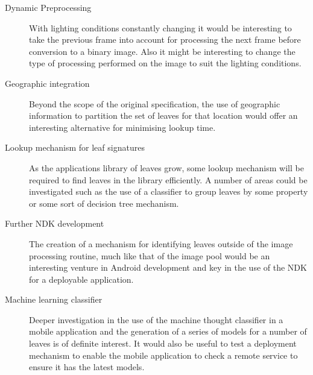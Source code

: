 \begin{description}
\item[Dynamic Preprocessing] With lighting conditions constantly changing it would be interesting to take the previous frame into account for processing the next frame before conversion to a binary image. Also it might be interesting to change the type of processing performed on the image to suit the lighting conditions.
\item[Geographic integration] Beyond the scope of the original specification, the use of geographic information to partition the set of leaves for that location would offer an interesting alternative for minimising lookup time.
\item[Lookup mechanism for leaf signatures] As the applications library of leaves grow, some lookup mechanism will be required to find leaves in the library efficiently. A number of areas could be investigated such as the use of a classifier to group leaves by some property or some sort of decision tree mechanism.
\item[Further NDK development] The creation of a mechanism for identifying leaves outside of the image processing routine, much like that of the image pool would be an interesting venture in Android development and key in the use of the NDK for a deployable application.
\item[Machine learning classifier] Deeper investigation in the use of the machine thought classifier in a mobile application and the generation of a series of models for a number of leaves is of definite interest. It would also be useful to test a deployment mechanism to enable the mobile application to check a remote service to ensure it has the latest models.
\end{description}




